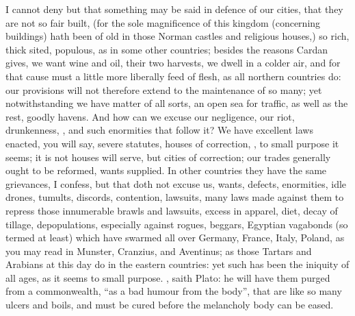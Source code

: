 I cannot deny but that something may be said in defence of our cities,
that they are not so fair built, (for the sole magnificence
of this kingdom (concerning buildings) hath been of old in those Norman castles
and religious houses,) so rich, thick sited, populous, as in some other
countries; besides the reasons Cardan gives,  we want wine and oil, their two harvests, we dwell in a colder air, and
for that cause must a little more liberally feed of flesh,
as all northern countries do: our provisions will not therefore extend to the
maintenance of so many; yet notwithstanding we have matter of all sorts, an
open sea for traffic, as well as the rest, goodly havens. And how can we excuse
our negligence, our riot, drunkenness, \etc{}, and such enormities that follow
it? We have excellent laws enacted, you will say, severe statutes, houses of
correction, \etc{}, to small purpose it seems; it is not houses will serve, but
cities of correction; our trades generally ought to be
reformed, wants supplied. In other countries they have the same grievances, I
confess, but that doth not excuse us, wants, defects,
enormities, idle drones, tumults, discords, contention, lawsuits, many laws
made against them to repress those innumerable brawls and lawsuits, excess in
apparel, diet, decay of tillage, depopulations, especially
against rogues, beggars, Egyptian vagabonds (so termed at least) which have
swarmed all over Germany, France, Italy, Poland, as you may
read in Munster, Cranzius, and Aventinus; as those Tartars
and Arabians at this day do in the eastern countries: yet such has been the
iniquity of all ages, as it seems to small purpose. , saith Plato: he will have them purged
from a commonwealth, \enquote{as a bad humour
from the body}, that are like so many ulcers and boils, and must be cured
before the melancholy body can be eased.

